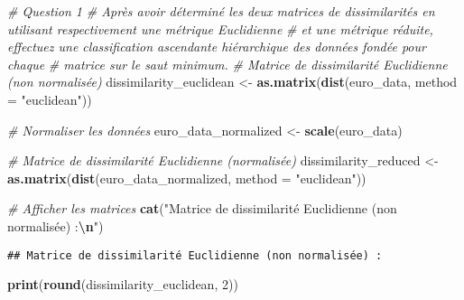 \documentclass[
]{article}
\newenvironment{Shaded}{\begin{snugshade}}{\end{snugshade}}
\newcommand{\AttributeTok}[1]{\textcolor[rgb]{0.13,0.29,0.53}{#1}}
\newcommand{\CommentTok}[1]{\textcolor[rgb]{0.56,0.35,0.01}{\textit{#1}}}
\newcommand{\DecValTok}[1]{\textcolor[rgb]{0.00,0.00,0.81}{#1}}
\newcommand{\FunctionTok}[1]{\textcolor[rgb]{0.13,0.29,0.53}{\textbf{#1}}}
\newcommand{\NormalTok}[1]{#1}
\newcommand{\OtherTok}[1]{\textcolor[rgb]{0.56,0.35,0.01}{#1}}
\newcommand{\SpecialCharTok}[1]{\textcolor[rgb]{0.81,0.36,0.00}{\textbf{#1}}}
\newcommand{\StringTok}[1]{\textcolor[rgb]{0.31,0.60,0.02}{#1}}
\begin{document}
\begin{Shaded}
\begin{Highlighting}[]
\CommentTok{\# Question 1  }
\CommentTok{\#  Après avoir déterminé les deux matrices de dissimilarités en utilisant respectivement une métrique Euclidienne}
\CommentTok{\# et une métrique réduite, effectuez une classification ascendante hiérarchique des données fondée pour chaque}
\CommentTok{\# matrice sur le saut minimum.}
\CommentTok{\# Matrice de dissimilarité Euclidienne (non normalisée)}
\NormalTok{dissimilarity\_euclidean }\OtherTok{\textless{}{-}} \FunctionTok{as.matrix}\NormalTok{(}\FunctionTok{dist}\NormalTok{(euro\_data, }\AttributeTok{method =} \StringTok{"euclidean"}\NormalTok{))}

\CommentTok{\# Normaliser les données}
\NormalTok{euro\_data\_normalized }\OtherTok{\textless{}{-}} \FunctionTok{scale}\NormalTok{(euro\_data)}

\CommentTok{\# Matrice de dissimilarité Euclidienne (normalisée)}
\NormalTok{dissimilarity\_reduced }\OtherTok{\textless{}{-}} \FunctionTok{as.matrix}\NormalTok{(}\FunctionTok{dist}\NormalTok{(euro\_data\_normalized, }\AttributeTok{method =} \StringTok{"euclidean"}\NormalTok{))}

\CommentTok{\# Afficher les matrices}
\FunctionTok{cat}\NormalTok{(}\StringTok{"Matrice de dissimilarité Euclidienne (non normalisée) :}\SpecialCharTok{\textbackslash{}n}\StringTok{"}\NormalTok{)}
\end{Highlighting}
\end{Shaded}

\begin{verbatim}
## Matrice de dissimilarité Euclidienne (non normalisée) :
\end{verbatim}

\begin{Shaded}
\begin{Highlighting}[]
\FunctionTok{print}\NormalTok{(}\FunctionTok{round}\NormalTok{(dissimilarity\_euclidean, }\DecValTok{2}\NormalTok{))}
\end{Highlighting}
\end{Shaded}
\end{document}
